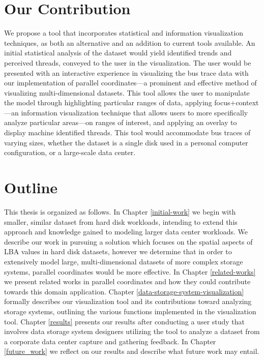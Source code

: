 \documentclass[12pt]{ucthesis}
\begin{document}
\section{Our Contribution}
\label{contribution}

We propose a tool that incorporates statistical and information visualization techniques, as both an alternative and an addition to current tools available.  An initial statistical analysis of the dataset would yield identified trends and perceived threads, conveyed to the user in the visualization. The user would be presented with an interactive experience in visualizing the bus trace data with our implementation of parallel coordinates---a prominent and effective method of visualizing multi-dimensional datasets. This tool allows the user to manipulate the model through highlighting particular ranges of data,  applying focus+context---an information visualization technique that allows users to more specifically analyze particular areas---on ranges of interest, and applying an overlay to display machine identified threads.  This tool would accommodate bus traces of varying sizes, whether the dataset is a single disk used in a personal computer configuration, or a large-scale data center.

\section{Outline}
\label{outline}
This thesis is organized as follows. In Chapter \ref{initial-work} we begin with smaller, similar dataset from hard disk workloads, intending to extend this approach and knowledge gained to modeling larger data center workloads. We describe our work in pursuing a solution which focuses on the spatial aspects of LBA values in hard disk datasets, however we determine that in order to extensively model large, multi-dimensional datasets of more complex storage systems, parallel coordinates would be more effective. In Chapter \ref{related-works} we present related works in parallel coordinates and how they could contribute towards this domain application. Chapter \ref{data-storage-system-visualization} formally describes our visualization tool and its contributions toward analyzing storage systems, outlining the various functions implemented in the visualization tool. Chapter \ref{results} presents our results after conducting a user study that involves data storage system designers utilizing the tool to analyze a dataset from a corporate data center capture and gathering feedback. In Chapter \ref{future_work} we reflect on our results and describe what future work may entail.
\end{document}
